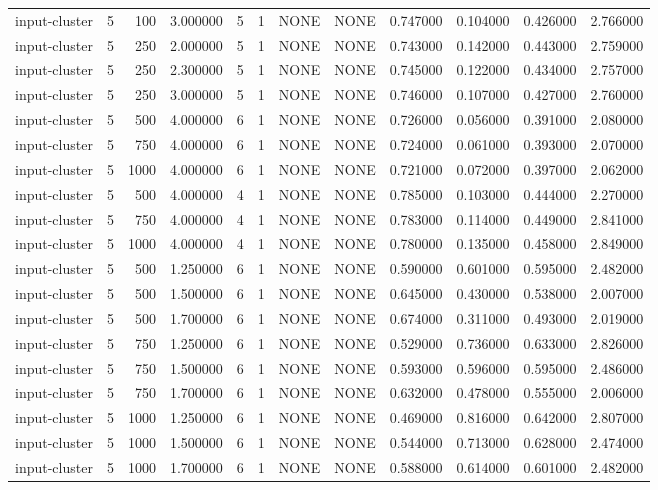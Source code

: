 \begin{tabular}{lrrrllllrrrr}
input-cluster & 5 & 100 & 3.000000 & 5 & 1 & NONE & NONE & 0.747000 & 0.104000 & 0.426000 & 2.766000 \\
input-cluster & 5 & 250 & 2.000000 & 5 & 1 & NONE & NONE & 0.743000 & 0.142000 & 0.443000 & 2.759000 \\
input-cluster & 5 & 250 & 2.300000 & 5 & 1 & NONE & NONE & 0.745000 & 0.122000 & 0.434000 & 2.757000 \\
input-cluster & 5 & 250 & 3.000000 & 5 & 1 & NONE & NONE & 0.746000 & 0.107000 & 0.427000 & 2.760000 \\
input-cluster & 5 & 500 & 4.000000 & 6 & 1 & NONE & NONE & 0.726000 & 0.056000 & 0.391000 & 2.080000 \\
input-cluster & 5 & 750 & 4.000000 & 6 & 1 & NONE & NONE & 0.724000 & 0.061000 & 0.393000 & 2.070000 \\
input-cluster & 5 & 1000 & 4.000000 & 6 & 1 & NONE & NONE & 0.721000 & 0.072000 & 0.397000 & 2.062000 \\
input-cluster & 5 & 500 & 4.000000 & 4 & 1 & NONE & NONE & 0.785000 & 0.103000 & 0.444000 & 2.270000 \\
input-cluster & 5 & 750 & 4.000000 & 4 & 1 & NONE & NONE & 0.783000 & 0.114000 & 0.449000 & 2.841000 \\
input-cluster & 5 & 1000 & 4.000000 & 4 & 1 & NONE & NONE & 0.780000 & 0.135000 & 0.458000 & 2.849000 \\
input-cluster & 5 & 500 & 1.250000 & 6 & 1 & NONE & NONE & 0.590000 & 0.601000 & 0.595000 & 2.482000 \\
input-cluster & 5 & 500 & 1.500000 & 6 & 1 & NONE & NONE & 0.645000 & 0.430000 & 0.538000 & 2.007000 \\
input-cluster & 5 & 500 & 1.700000 & 6 & 1 & NONE & NONE & 0.674000 & 0.311000 & 0.493000 & 2.019000 \\
input-cluster & 5 & 750 & 1.250000 & 6 & 1 & NONE & NONE & 0.529000 & 0.736000 & 0.633000 & 2.826000 \\
input-cluster & 5 & 750 & 1.500000 & 6 & 1 & NONE & NONE & 0.593000 & 0.596000 & 0.595000 & 2.486000 \\
input-cluster & 5 & 750 & 1.700000 & 6 & 1 & NONE & NONE & 0.632000 & 0.478000 & 0.555000 & 2.006000 \\
input-cluster & 5 & 1000 & 1.250000 & 6 & 1 & NONE & NONE & 0.469000 & 0.816000 & 0.642000 & 2.807000 \\
input-cluster & 5 & 1000 & 1.500000 & 6 & 1 & NONE & NONE & 0.544000 & 0.713000 & 0.628000 & 2.474000 \\
input-cluster & 5 & 1000 & 1.700000 & 6 & 1 & NONE & NONE & 0.588000 & 0.614000 & 0.601000 & 2.482000 \\

\end{tabular}
